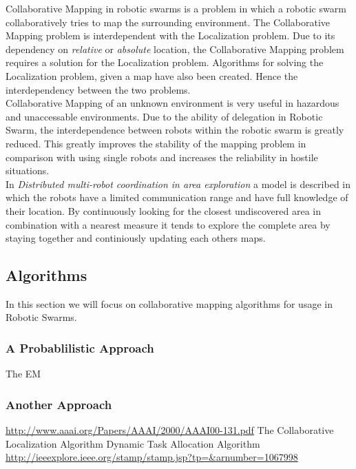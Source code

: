 Collaborative Mapping in robotic swarms is a problem in which a robotic swarm collaboratively tries to map the surrounding environment. 
The Collaborative Mapping problem is interdependent with the Localization problem.\cite{thrun2000real}
Due to its dependency on \emph{relative} or \emph{absolute} location, the Collaborative Mapping problem requires a solution for the Localization problem.
Algorithms for solving the Localization problem, given a map have also been created.\cite{borenstein1996navigating} Hence the interdependency between the two problems.\\

Collaborative Mapping of an unknown environment is very useful in hazardous and unaccessable environments.\cite{hardin2004modified}
Due to the ability of delegation in Robotic Swarm, the interdependence between robots within the robotic swarm is greatly reduced.
This greatly improves the stability of the mapping problem in comparison with using single robots and increases the reliability in hostile situations.\\

In \emph{Distributed multi-robot coordination in area exploration} \cite{sheng2006distributed} a model is described in which the robots have a limited communication range and have full knowledge of their location.
By continuously looking for the closest undiscovered area in combination with a nearest measure it tends to explore the complete area by staying together and continiously updating each others maps.

\subsection{Algorithms}
In this section we will focus on collaborative mapping algorithms for usage in Robotic Swarms.

\subsubsection{A Probablilistic Approach}
The EM
\subsubsection{Another Approach}
\url{http://www.aaai.org/Papers/AAAI/2000/AAAI00-131.pdf}
The Collaborative Localization Algorithm
Dynamic Task Allocation Algorithm
\url{http://ieeexplore.ieee.org/stamp/stamp.jsp?tp=&arnumber=1067998}


